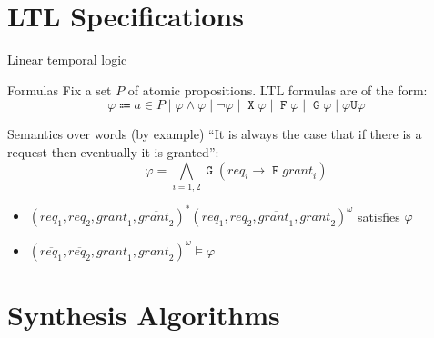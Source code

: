 \documentclass[aspectratio=169]{beamer}
\newcommand{\always}{\mathop{\mathtt{G}}}
\newcommand{\evtly}{\mathop{\mathtt{F}}}
\newcommand{\until}{\mathrel{\mathtt{U}}}
\newcommand{\nxt}{\mathop{\mathtt{X}}}
\begin{document}
\section{LTL Specifications}

\begin{frame}{Linear temporal logic}
  \begin{block}{Formulas}
    Fix a set $P$ of \alert{atomic propositions}. LTL formulas are of the
    form:
    \[
      \varphi \Coloneqq a \in P \mid \varphi \land \varphi \mid
      \lnot \varphi \mid \nxt \varphi \mid \evtly \varphi \mid
      \always \varphi \mid \varphi \until \varphi
    \]
  \end{block}
  \pause
  \begin{block}{Semantics over words (by example)}
    ``It is always the case that if there is a request then eventually it is
    granted'':
    \[ \varphi = \bigwedge_{i=1,2} \always(\mathit{req}_i \rightarrow \evtly
    \mathit{grant}_i)\]
    \begin{itemize}
      \item
        $(\mathit{req}_1,\mathit{req}_2,\mathit{grant}_1,\overline{\mathit{grant}_2})^*
        (\overline{\mathit{req}_1},\overline{\mathit{req}_2},\overline{\mathit{grant}_1},\mathit{grant}_2)^\omega$
        \alert{satisfies} $\varphi$
        \pause
      \item
        $(\overline{\mathit{req}_1},\overline{\mathit{req}_2},\mathit{grant}_1,\mathit{grant}_2)^\omega
        \models \varphi$
    \end{itemize}
  \end{block}
\end{frame}

\section{Synthesis Algorithms}
\end{document}
